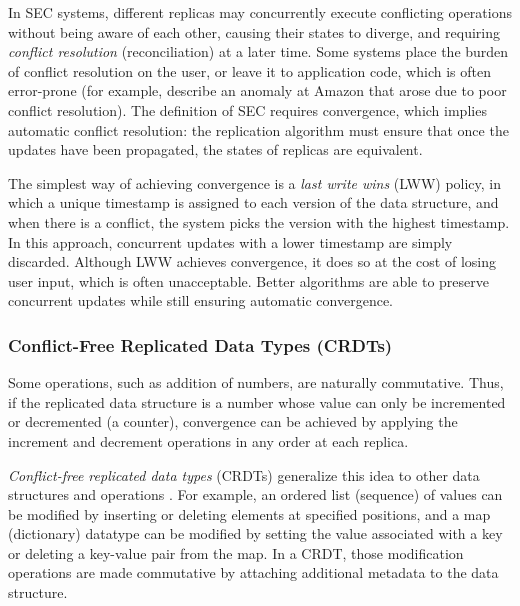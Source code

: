 In SEC systems, different replicas may concurrently execute conflicting operations without being
aware of each other, causing their states to diverge, and requiring \emph{conflict resolution}
(reconciliation) at a later time. Some systems place the burden of conflict resolution on the user,
or leave it to application code, which is often error-prone (for example, \citet{DeCandia:2007ui}
describe an anomaly at Amazon that arose due to poor conflict resolution). The definition of SEC
requires convergence, which implies automatic conflict resolution: the replication algorithm must
ensure that once the updates have been propagated, the states of replicas are equivalent.

The simplest way of achieving convergence is a \emph{last write wins} (LWW) policy, in which a
unique timestamp is assigned to each version of the data structure, and when there is a conflict,
the system picks the version with the highest timestamp. In this approach, concurrent updates with a
lower timestamp are simply discarded. Although LWW achieves convergence, it does so at the cost of
losing user input, which is often unacceptable. Better algorithms are able to preserve concurrent
updates while still ensuring automatic convergence.

\subsubsection{Conflict-Free Replicated Data Types (CRDTs)}

Some operations, such as addition of numbers, are naturally commutative. Thus, if the replicated
data structure is a number whose value can only be incremented or decremented (a counter),
convergence can be achieved by applying the increment and decrement operations in any order at each
replica.

\emph{Conflict-free replicated data types} (CRDTs) generalize this idea to other data structures and
operations
\cite{Shapiro:2011wy,Shapiro:2011un,Roh:2011dw,Preguica:2009fz,Oster:2006wj,Weiss:2010hx,Nedelec:2013ky,Kleppmann:2016ve}.
For example, an ordered list (sequence) of values can be modified by inserting or deleting elements
at specified positions, and a map (dictionary) datatype can be modified by setting the value
associated with a key or deleting a key-value pair from the map. In a CRDT, those modification
operations are made commutative by attaching additional metadata to the data structure.


